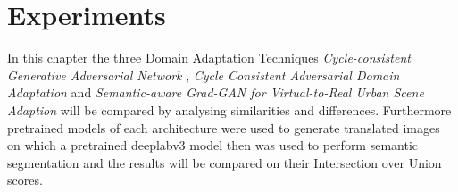 \chapter{Experiments}
\label{sec:experiments}

In this chapter the three Domain Adaptation Techniques \textit{Cycle-consistent Generative Adversarial Network} \cite{DBLP:journals/corr/ZhuPIE17}, \textit{Cycle Consistent Adversarial Domain Adaptation} \cite{DBLP:journals/corr/abs-1711-03213} and \textit{Semantic-aware Grad-GAN for Virtual-to-Real Urban Scene Adaption} \cite{DBLP:journals/corr/abs-1801-01726} will be compared by analysing similarities and differences. Furthermore pretrained models of each architecture were used to generate translated images on which a pretrained deeplabv3 model then was used to perform semantic segmentation and the results will be compared on their Intersection over Union scores.


